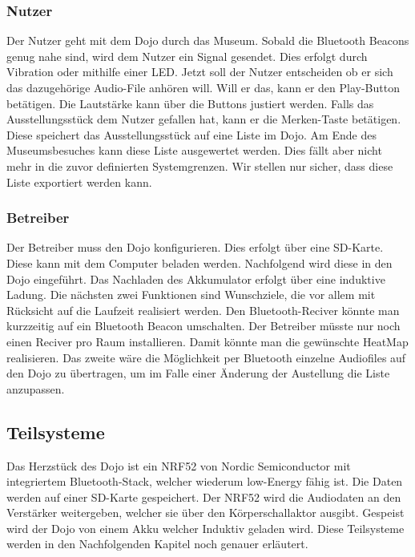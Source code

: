 \subsubsection*{Nutzer}
Der Nutzer geht mit dem Dojo durch das Museum. Sobald die Bluetooth Beacons genug nahe sind, wird dem Nutzer ein Signal gesendet. Dies erfolgt durch Vibration oder mithilfe einer LED. Jetzt soll der Nutzer entscheiden ob er sich das dazugehörige Audio-File anhören will. Will er das, kann er den Play-Button betätigen. Die Lautstärke kann über die Buttons justiert werden. Falls das Ausstellungsstück dem Nutzer gefallen hat, kann er die Merken-Taste betätigen. Diese speichert das Ausstellungsstück auf eine Liste im Dojo. Am Ende des Museumsbesuches kann diese Liste ausgewertet werden. Dies fällt aber nicht mehr in die zuvor definierten Systemgrenzen. Wir stellen nur sicher, dass diese Liste exportiert werden kann.
\subsubsection*{Betreiber}
Der Betreiber muss den Dojo konfigurieren. Dies erfolgt über eine SD-Karte. Diese kann mit dem Computer beladen werden. Nachfolgend wird diese in den Dojo eingeführt. Das Nachladen des Akkumulator erfolgt über eine induktive Ladung. Die nächsten zwei Funktionen sind Wunschziele, die vor allem mit Rücksicht auf die Laufzeit realisiert werden. Den Bluetooth-Reciver könnte man kurzzeitig auf ein Bluetooth Beacon umschalten. Der Betreiber müsste nur noch einen Reciver pro Raum installieren. Damit könnte man die gewünschte HeatMap realisieren. Das zweite wäre die Möglichkeit per Bluetooth einzelne Audiofiles auf den Dojo zu übertragen, um im Falle einer Änderung der Austellung die Liste anzupassen.

\subsection{Teilsysteme}
Das Herzstück des Dojo ist ein NRF52 von Nordic Semiconductor mit integriertem Bluetooth-Stack, welcher wiederum low-Energy fähig ist. Die Daten werden auf einer SD-Karte gespeichert. Der NRF52 wird die Audiodaten an den Verstärker weitergeben, welcher sie über den Körperschallaktor ausgibt. Gespeist wird der Dojo von einem Akku welcher Induktiv geladen wird. Diese Teilsysteme werden in den Nachfolgenden Kapitel noch genauer erläutert.

